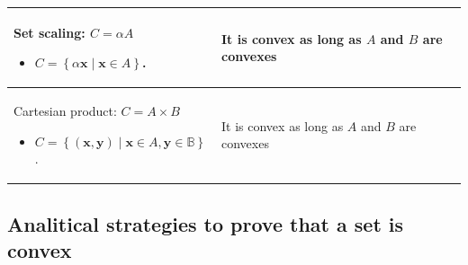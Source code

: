\documentclass{article}
\begin{document}
\begin{xltabular}[l]{0.5\linewidth}{|X|X|}
    \hline
    Set scaling: $C = \alpha A$
    \begin{itemize}[leftmargin=*]
        \item \(C = \left\{ \alpha \mathbf{x} \mid \mathbf{x} \in A \right\}\).
    \end{itemize} & It is convex as long as \(A\) and \(B\) are convexes\\
    \hline
    Cartesian product: $C = A \times B $
    \begin{itemize}[leftmargin=*]
        \item \(C = \left\{ (\mathbf{x}, \mathbf{y}) \mid \mathbf{x} \in A, \mathbf{y} \in \mathbb{B} \right\}\).
    \end{itemize} & It is convex as long as \(A\) and \(B\) are convexes\\
    \hline
\end{xltabular}

\subsection{Analitical strategies to prove that a set is convex}
\end{document}
